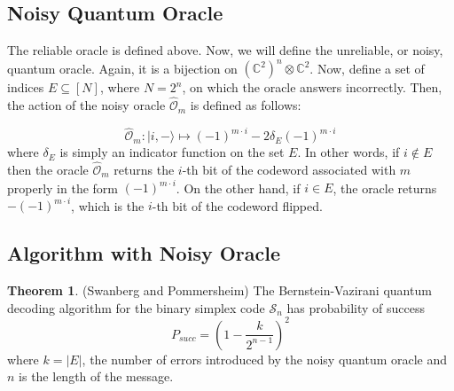 \documentclass[12pt,twoside]{reedthesis}
\theoremstyle{definition}
\newtheorem{theorem}{Theorem}[chapter]
\newcommand{\C}{\mathbb{C}}
\newcommand{\ket}[1]{\ensuremath{\lvert #1\rangle}\xspace}
\begin{document}
\subsection{Noisy Quantum Oracle}
The reliable oracle is defined above. Now, we will define the unreliable, or noisy, quantum oracle. Again, it is a bijection on $(\C^2)^n \otimes \C^2$. Now, define a set of indices $E \subseteq [N]$, where $N = 2^n$, on which the oracle answers incorrectly. Then, the action of the noisy oracle $\widehat{\mathcal{O}}_m$ is defined as follows:

\begin{equation*}
\widehat{\mathcal{O}}_m: \ket{i, -} \longmapsto (-1)^{m \cdot i} - 2\delta_E (-1)^{m \cdot i}
\end{equation*}
where $\delta_E$ is simply an indicator function on the set $E$. In other words, if $i \notin E$ then the oracle $\widehat{\mathcal{O}}_m$ returns the $i$-th bit of the codeword associated with $m$ properly in the form $(-1)^{m \cdot i}$. On the other hand, if $i \in E$, the oracle returns $-(-1)^{m\cdot i}$, which is the $i$-th bit of the codeword flipped.
\subsection{Algorithm with Noisy Oracle}
\begin{theorem} \label{cool_thm}(Swanberg and Pommersheim) The Bernstein-Vazirani quantum decoding algorithm for the binary simplex code $\mathcal{S}_n$ has probability of success
\begin{equation*}
P_{succ} = \left(1 - \frac{k}{2^{n-1}}\right)^2
\end{equation*}
where $k= \lvert E \rvert$, the number of errors introduced by the noisy quantum oracle and $n$ is the length of the message.
\end{theorem}
\end{document}
